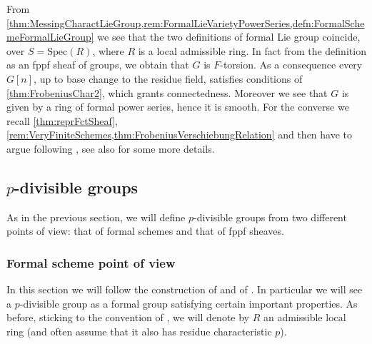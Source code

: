 \begin{rem}
	From 
	\cref{thm:MessingCharactLieGroup,rem:FormalLieVarietyPowerSeries,defn:FormalSchemeFormalLieGroup}
	we see that the two definitions of formal Lie group coincide, over
	$S = \mathrm{Spec}(R)$, where $R$ is a local admissible ring.
	In fact from the definition as an fppf sheaf of groups,
	we obtain that $G$ is $F$-torsion.
	As a consequence every $G[n]$, up to base
	change to the residue field, satisfies conditions of \cref{thm:FrobeniusChar2},
	which grants connectedness.
	Moreover we see that $G$ is given by a ring of formal power series,
	hence it is smooth.
	For the converse we recall
	\cref{thm:reprFctSheaf},
	\cref{rem:VeryFiniteSchemes,thm:FrobeniusVerschiebungRelation}
	and then have to argue following \cite[proposition 1]{TatePC}, see
	also \cite[Chapter II, \S2, theorem 2.1.7]{Messing} for some more details.
\end{rem}



\subsection{\texorpdfstring{$p$}{p}-divisible groups}
As in the previous section, we will define $p$-divisible groups
from two different points of view: that of formal schemes
and that of fppf sheaves.



\subsubsection{Formal scheme point of view}
In this section we will follow the construction of \cite[\S2]{TatePC} and
of \cite[\S6]{Shatz}. 
In particular we will see a $p$-divisible group as a formal group
satisfying certain important properties.
As before, sticking to the convention of \cite{Shatz}, we will 
denote by $R$ an admissible local ring (and often assume that
it also has residue characteristic $p$).


